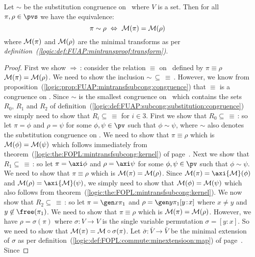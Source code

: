 \begin{theorem}\label{logic:the:FUAP:mintransfsubcong:kernel}
Let $\sim$ be the substitution congruence on \pvs\ where $V$ is a
set. Then for all $\pi,\rho\in\pvs$ we have the equivalence:
    \[
    \pi\sim\rho\ \Leftrightarrow\ {\cal M}(\pi)={\cal M}(\rho)
    \]
where ${\cal M}(\pi)$ and ${\cal M}(\rho)$ are the minimal
transforms as per {\em
definition~(\ref{logic:def:FUAP:mintransproof:transform})}.
\end{theorem}
\begin{proof}
First we show $\Rightarrow$\,: consider the relation $\equiv$ on
\pvs\ defined by $\pi\equiv\rho$ \ifand\ ${\cal M}(\pi)={\cal
M}(\rho)$. We need to show the inclusion
$\sim\,\subseteq\,\equiv$\,. However, we know from
proposition~(\ref{logic:prop:FUAP:mintransfsubcong:congruence}) that
$\equiv$ is a congruence on \pvs. Since $\sim$ is the smallest
congruence on \pvs\ which contains the sets $R_{0}$, $R_{1}$ and
$R_{2}$ of
definition~(\ref{logic:def:FUAP:subcong:substitution:congruence}) we
simply need to show that $R_{i}\subseteq\,\equiv$ for $i\in 3$.
First we show that $R_{0}\subseteq\,\equiv$\,: so let $\pi=\phi$ and
$\rho=\psi$ for some $\phi,\psi\in\pv$ such that $\phi\sim\psi$,
where $\sim$ also denotes the substitution congruence on \pv. We
need to show that $\pi\equiv\rho$ which is ${\cal M}(\phi)={\cal
M}(\psi)$ which follows immediately from
theorem~(\ref{logic:the:FOPL:mintransfsubcong:kernel}) of
page~\pageref{logic:the:FOPL:mintransfsubcong:kernel}. Next we show
that $R_{1}\subseteq\,\equiv$\,: so let $\pi=\axi\phi$ and
$\rho=\axi\psi$ for some $\phi,\psi\in\pv$ such that $\phi\sim\psi$.
We need to show that $\pi\equiv\rho$ which is ${\cal M}(\pi)={\cal
M}(\rho)$. Since ${\cal M}(\pi)=\axi{\cal M}(\phi)$ and ${\cal
M}(\rho)=\axi{\cal M}(\psi)$, we simply need to show that ${\cal
M}(\phi)={\cal M}(\psi)$ which also follows from
theorem~(\ref{logic:the:FOPL:mintransfsubcong:kernel}). We now show
that $R_{2}\subseteq\,\equiv$\,: so let $\pi=\gen x\pi_{1}$ and
$\rho=\gen y\pi_{1}[y\!:\!x]$ where $x\neq y$ and
$y\not\in\free(\pi_{1})$. We need to show that $\pi\equiv\rho$ which
is ${\cal M}(\pi)={\cal M}(\rho)$. However, we have
$\rho=\sigma(\pi)$ where $\sigma:V\to V$ is the single variable
permutation $\sigma=[y\!:\!x]$. So we need to show that ${\cal
M}(\pi)={\cal M}\circ\sigma(\pi)$. Let
$\bar{\sigma}:\bar{V}\to\bar{V}$ be the minimal extension of
$\sigma$ as per
definition~(\ref{logic:def:FOPL:commute:minextensioon:map}) of
page~\pageref{logic:def:FOPL:commute:minextensioon:map}. Since

\end{proof}
